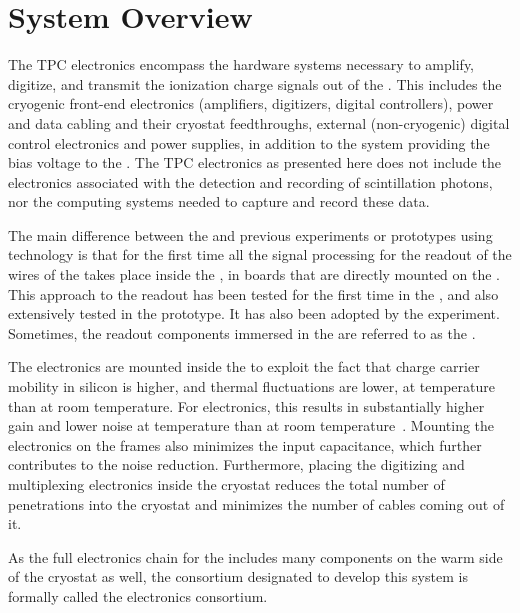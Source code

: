 \section{System Overview}
\label{sec:fdsp-tpcelec-overview}

The TPC electronics encompass the hardware systems necessary to 
amplify, digitize, and transmit the  ionization charge 
signals out of the   . This 
includes the cryogenic front-end electronics (amplifiers, digitizers, 
digital controllers), power and data cabling and their cryostat 
feedthroughs, external (non-cryogenic) digital control electronics and 
power supplies, in addition to the system providing the bias voltage
to the .  The TPC electronics as presented here does not 
include the electronics associated with the detection 
and recording of  scintillation photons, nor the  
computing systems needed to capture and record these data.

The main difference between the    
and previous experiments or prototypes using  technology is
that for the first time all the signal processing for the readout of the
wires of the  takes place inside the , in boards that 
are directly mounted on the . This approach to the 
readout has been tested for the first time in the  ,
and also extensively tested in the  prototype. It has also 
been adopted by the  experiment. Sometimes, the 
 readout components immersed in the  are referred 
to as the . 

The electronics are mounted inside the  to exploit the fact that 
charge carrier mobility in silicon is higher, and thermal fluctuations are lower,  
at  temperature than at room temperature. For  
electronics, this results in substantially higher gain and lower noise 
at  temperature than at room temperature~\cite{DeGeronimo:2011zz}.
Mounting the  electronics on the  frames also minimizes 
the input capacitance, which further contributes to the noise reduction.  
Furthermore, placing the digitizing and multiplexing electronics inside 
the cryostat reduces the total number of penetrations into the cryostat 
and minimizes the number of cables coming out of it.

As the full  electronics chain for the  includes 
many components on the warm side of the cryostat as well, the  
consortium designated to develop this system is formally called 
the    electronics consortium.

